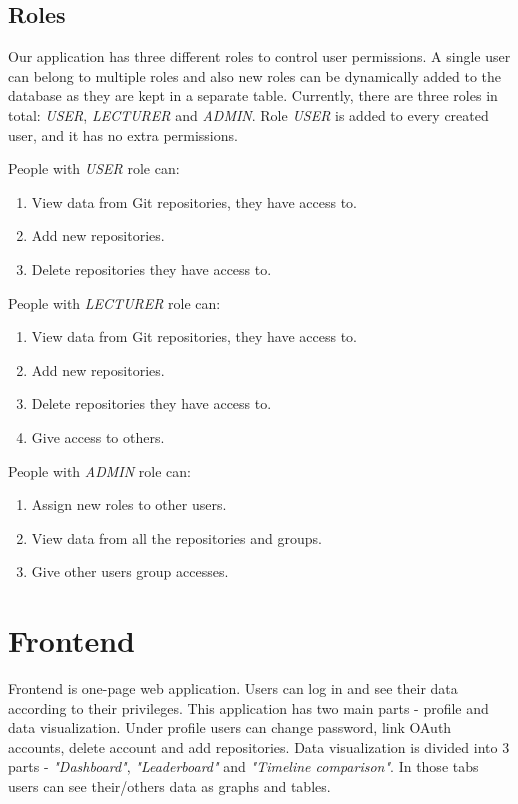 \subsection{Roles}\label{subsec:roles}
Our application has three different roles to control user permissions.
A single user can belong to multiple roles and also new roles can be dynamically added to the database as they are
kept in a separate table.
Currently, there are three roles in total: \textit{USER}, \textit{LECTURER} and \textit{ADMIN}.
Role \textit{USER} is added to every created user, and it has no extra permissions.

People with \textit{USER} role can:
\begin{enumerate}
    \item View data from Git repositories, they have access to.
    \item Add new repositories.
    \item Delete repositories they have access to.
\end{enumerate}

People with \textit{LECTURER} role can:
\begin{enumerate}
    \item View data from Git repositories, they have access to.
    \item Add new repositories.
    \item Delete repositories they have access to.
    \item Give access to others.
\end{enumerate}

People with \textit{ADMIN} role can:
\begin{enumerate}
    \item Assign new roles to other users.
    \item View data from all the repositories and groups.
    \item Give other users group accesses.
\end{enumerate}

\section{Frontend}\label{sec:frontend-content}
Frontend is one-page web application.
Users can log in and see their data according to their privileges.
This application has two main parts - profile and data visualization.
Under profile users can change password, link OAuth accounts, delete account and add repositories.
Data visualization is divided into 3 parts - \textit{"Dashboard"}, \textit{"Leaderboard"} and \textit{"Timeline comparison"}.
In those tabs users can see their/others data as graphs and tables.

